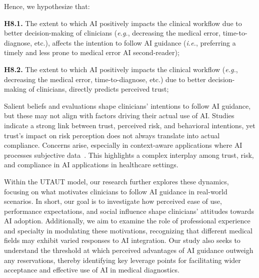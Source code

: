 \vspace{2.00mm}

\noindent
Hence, we hypothesize that:

\vspace{2.00mm}

\noindent
{\bf H8.1.} The extent to which \ac{AI} positively impacts the clinical workflow due to better decision-making of clinicians ({\it e.g.}, decreasing the medical error, time-to-diagnose, etc.), affects the intention to follow \ac{AI} guidance ({\it i.e.}, preferring a timely and less prone to medical error \ac{AI} second-reader);

\vspace{2.00mm}

\noindent
{\bf H8.2.} The extent to which \ac{AI} positively impacts the clinical workflow ({\it e.g.}, decreasing the medical error, time-to-diagnose, etc.) due to better decision-making of clinicians, directly predicts perceived trust;

\vspace{2.00mm}

\textcolor{revised}{Salient beliefs and evaluations shape clinicians' intentions to follow \ac{AI} guidance, but these may not align with factors driving their actual use of \ac{AI}\cite{KHALILZADEH2017460}.
Studies indicate a strong link between trust, perceived risk, and behavioral intentions\cite{GANSSER2021101535, WAYMEL2019327}, yet trust's impact on risk perception does not always translate into actual compliance.
Concerns arise, especially in context-aware applications where \ac{AI} processes subjective data~\cite{10.1145/3313831.3376506}.
This highlights a complex interplay among trust, risk, and compliance in \ac{AI} applications in healthcare settings.}

\textcolor{revised}{Within the \ac{UTAUT} model, our research further explores these dynamics, focusing on what motivates clinicians to follow \ac{AI} guidance in real-world scenarios.
In short, our goal is to investigate how perceived ease of use, performance expectations, and social influence shape clinicians' attitudes towards \ac{AI} adoption.
Additionally, we aim to examine the role of professional experience and specialty in modulating these motivations, recognizing that different medical fields may exhibit varied responses to \ac{AI} integration.
Our study also seeks to understand the threshold at which perceived advantages of \ac{AI} guidance outweigh any reservations, thereby identifying key leverage points for facilitating wider acceptance and effective use of \ac{AI} in medical diagnostics.}

